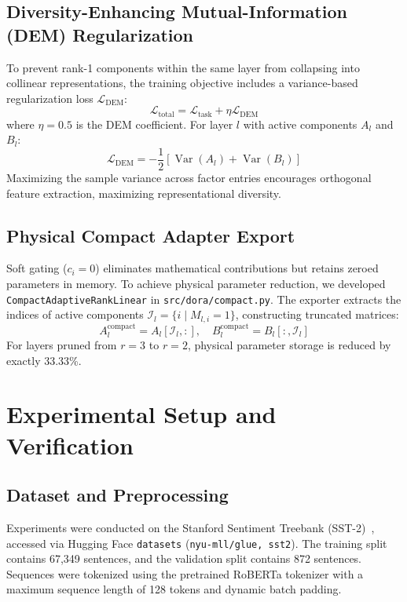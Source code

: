 \documentclass[conference]{IEEEtran}
\begin{document}
\subsection{Diversity-Enhancing Mutual-Information (DEM) Regularization}
To prevent rank-1 components within the same layer from collapsing into collinear representations, the training objective includes a variance-based regularization loss $\mathcal{L}_{\text{DEM}}$:
\begin{equation}
  \mathcal{L}_{\text{total}} = \mathcal{L}_{\text{task}} + \eta \mathcal{L}_{\text{DEM}}
  \label{eq:loss}
\end{equation}
where $\eta = 0.5$ is the DEM coefficient. For layer $l$ with active components $A_l$ and $B_l$:
\begin{equation}
  \mathcal{L}_{\text{DEM}} = -\frac{1}{2} \left[ \operatorname{Var}(A_l) + \operatorname{Var}(B_l) \right]
  \label{eq:dem}
\end{equation}
Maximizing the sample variance across factor entries encourages orthogonal feature extraction, maximizing representational diversity.

\subsection{Physical Compact Adapter Export}
Soft gating ($c_i = 0$) eliminates mathematical contributions but retains zeroed parameters in memory. To achieve physical parameter reduction, we developed \texttt{CompactAdaptiveRankLinear} in \texttt{src/dora/compact.py}. The exporter extracts the indices of active components $\mathcal{I}_l = \{i \mid M_{l,i} = 1\}$, constructing truncated matrices:
\begin{equation}
  A_l^{\text{compact}} = A_l[\mathcal{I}_l, :], \quad B_l^{\text{compact}} = B_l[:, \mathcal{I}_l]
  \label{eq:compact}
\end{equation}
For layers pruned from $r=3$ to $r=2$, physical parameter storage is reduced by exactly 33.33\%.

\section{Experimental Setup and Verification}
\label{sec:setup}

\subsection{Dataset and Preprocessing}
Experiments were conducted on the Stanford Sentiment Treebank (SST-2)~\cite{socher2013recursive,wang2018glue}, accessed via Hugging Face \texttt{datasets} (\texttt{nyu-mll/glue, sst2}). The training split contains 67,349 sentences, and the validation split contains 872 sentences. Sequences were tokenized using the pretrained RoBERTa tokenizer with a maximum sequence length of 128 tokens and dynamic batch padding.
\end{document}

